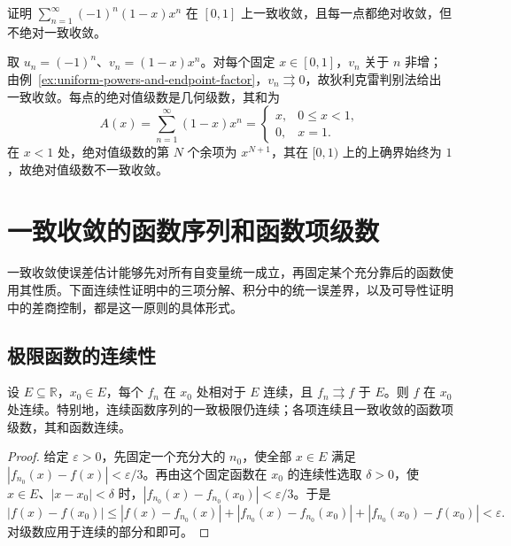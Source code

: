 \documentclass[UTF8,12pt,a4paper,fontset=fandol]{ctexbook}
\begin{document}
\begin{example}
\label{ex:uniform-and-pointwise-absolute-not-absolute-uniform}
证明 $\sum_{n=1}^\infty(-1)^n(1-x)x^n$ 在 $[0,1]$ 上一致收敛，且每一点都绝对收敛，但不绝对一致收敛。
\end{example}

\begin{solve}
取 $u_n=(-1)^n$、$v_n=(1-x)x^n$。对每个固定 $x\in[0,1]$，$v_n$ 关于 $n$ 非增；由例~\ref{ex:uniform-powers-and-endpoint-factor}，$v_n\rightrightarrows0$，故狄利克雷判别法给出一致收敛。每点的绝对值级数是几何级数，其和为
\[
    A(x)=\sum_{n=1}^\infty(1-x)x^n
    =\begin{cases}x,&0\leq x<1,\\0,&x=1.\end{cases}
\]
在 $x<1$ 处，绝对值级数的第 $N$ 个余项为 $x^{N+1}$，其在 $[0,1)$ 上的上确界始终为 $1$，故绝对值级数不一致收敛。
\end{solve}

\section{一致收敛的函数序列和函数项级数}
\label{sec:uniformly-convergent-function-sequences-and-series}

一致收敛使误差估计能够先对所有自变量统一成立，再固定某个充分靠后的函数使用其性质。下面连续性证明中的三项分解、积分中的统一误差界，以及可导性证明中的差商控制，都是这一原则的具体形式。

\subsection{极限函数的连续性}
\label{subsec:continuity-of-limit-functions}

\begin{theorem}[连续性与一致极限]
\label{thm:continuity-of-uniform-limit}
设 $E\subseteq\mathbb R$，$x_0\in E$，每个 $f_n$ 在 $x_0$ 处相对于 $E$ 连续，且 $f_n\rightrightarrows f$ 于 $E$。则 $f$ 在 $x_0$ 处连续。特别地，连续函数序列的一致极限仍连续；各项连续且一致收敛的函数项级数，其和函数连续。
\end{theorem}

\begin{proof}
给定 $\varepsilon>0$，先固定一个充分大的 $n_0$，使全部 $x\in E$ 满足 $|f_{n_0}(x)-f(x)|<\varepsilon/3$。再由这个固定函数在 $x_0$ 的连续性选取 $\delta>0$，使 $x\in E$、$|x-x_0|<\delta$ 时，$|f_{n_0}(x)-f_{n_0}(x_0)|<\varepsilon/3$。于是
\[
    |f(x)-f(x_0)|
    \leq |f(x)-f_{n_0}(x)|
       +|f_{n_0}(x)-f_{n_0}(x_0)|
       +|f_{n_0}(x_0)-f(x_0)|<\varepsilon.
\]
对级数应用于连续的部分和即可。
\end{proof}
\end{document}
